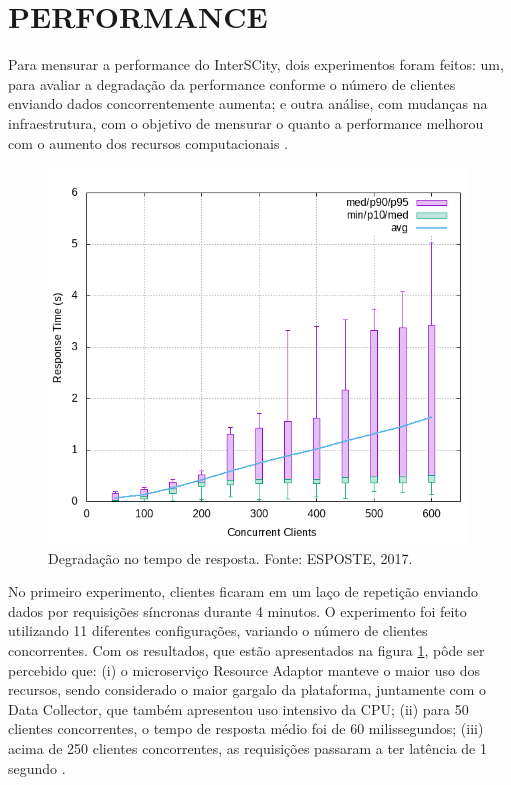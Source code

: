 \section{PERFORMANCE}

Para mensurar a performance do InterSCity, dois experimentos foram feitos:
um, para avaliar a degradação da performance conforme o número de clientes
enviando dados concorrentemente aumenta; e outra análise, com mudanças na %
infraestrutura, com o objetivo de mensurar o quanto a performance melhorou
com o aumento dos recursos computacionais \cite{delesposte2017}.

\begin{figure}
  \centering
    \includegraphics[scale=0.7]{figuras/benchmark1.png}
    \caption{Degradação no tempo de resposta. Fonte: ESPOSTE, 2017.}
  \label{fig:benchmark1}
\end{figure}

No primeiro experimento, clientes ficaram em um laço de repetição enviando
dados por requisições síncronas durante 4 minutos. O experimento foi feito
utilizando 11 diferentes configurações, variando o número de clientes
concorrentes. Com os resultados, que estão apresentados na figura
\ref{fig:benchmark1}, pôde ser percebido que: (i) o microserviço
Resource Adaptor manteve o maior uso dos recursos, sendo considerado o
maior gargalo da plataforma, juntamente com o Data Collector, que também
apresentou uso intensivo da CPU; (ii) para 50 clientes concorrentes, o
tempo de resposta médio foi de 60 milissegundos; (iii) acima de 250 clientes
concorrentes, as requisições passaram a ter latência de 1 segundo
\cite{delesposte2017}.

